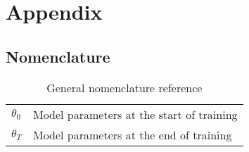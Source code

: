 \chapter{Appendix}
\section{Nomenclature}
\begin{table}[htb]
    \centering
    \begin{tabular}{ll}
        $\theta_0$ & Model parameters at the start of training \\ 
        $\theta_T$ & Model parameters at the end of training \\
    \end{tabular}
    \caption{General nomenclature reference}
    \label{tab:nomenclature}
\end{table}